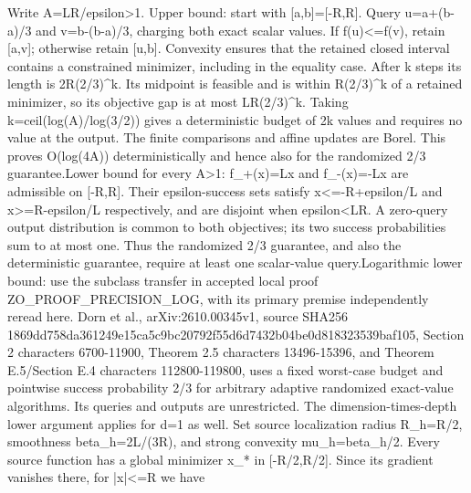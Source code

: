 \documentclass[10pt,a4paper]{article}
\begin{document}
\begingroup\raggedright\sloppy Write A=\allowbreak{}LR/\allowbreak{}epsilon>1. Upper bound:\allowbreak{} start with [a,\allowbreak{}b]=\allowbreak{}[-R,\allowbreak{}R]. Query u=\allowbreak{}a+(b-a)/\allowbreak{}3 and v=\allowbreak{}b-(b-a)/\allowbreak{}3,\allowbreak{} charging both exact scalar values. If f(u)<=\allowbreak{}f(v),\allowbreak{} retain [a,\allowbreak{}v];\allowbreak{} otherwise retain [u,\allowbreak{}b]. Convexity ensures that the retained closed interval contains a constrained minimizer,\allowbreak{} including in the equality case. After k steps its length is 2R(2/\allowbreak{}3)\textasciicircum{}k. Its midpoint is feasible and is within R(2/\allowbreak{}3)\textasciicircum{}k of a retained minimizer,\allowbreak{} so its objective gap is at most LR(2/\allowbreak{}3)\textasciicircum{}k. Taking k=\allowbreak{}ceil(log(A)/\allowbreak{}log(3/\allowbreak{}2)) gives a deterministic budget of 2k values and requires no value at the output. The finite comparisons and affine updates are Borel. This proves O(log(4A)) deterministically and hence also for the randomized 2/\allowbreak{}3 guarantee.\newline{}\newline{}Lower bound for every A>1:\allowbreak{} f\_\allowbreak{}+(x)=\allowbreak{}Lx and f\_\allowbreak{}-(x)=\allowbreak{}-Lx are admissible on [-R,\allowbreak{}R]. Their epsilon-success sets satisfy x<=\allowbreak{}-R+epsilon/\allowbreak{}L and x>=\allowbreak{}R-epsilon/\allowbreak{}L respectively,\allowbreak{} and are disjoint when epsilon<LR. A zero-query output distribution is common to both objectives;\allowbreak{} its two success probabilities sum to at most one. Thus the randomized 2/\allowbreak{}3 guarantee,\allowbreak{} and also the deterministic guarantee,\allowbreak{} require at least one scalar-value query.\newline{}\newline{}Logarithmic lower bound:\allowbreak{} use the subclass transfer in accepted local proof ZO\_\allowbreak{}PROOF\_\allowbreak{}PRECISION\_\allowbreak{}LOG,\allowbreak{} with its primary premise independently reread here. Dorn et al.,\allowbreak{} arXiv:\allowbreak{}2610.00345v1,\allowbreak{} source SHA256 1869dd758da361249e15ca5c9bc20792f55d6d7432b04be0d818323539baf105,\allowbreak{} Section 2 characters 6700-11900,\allowbreak{} Theorem 2.5 characters 13496-15396,\allowbreak{} and Theorem E.5/\allowbreak{}Section E.4 characters 112800-119800,\allowbreak{} uses a fixed worst-case budget and pointwise success probability 2/\allowbreak{}3 for arbitrary adaptive randomized exact-value algorithms. Its queries and outputs are unrestricted. The dimension-times-depth lower argument applies for d=\allowbreak{}1 as well. Set source localization radius R\_\allowbreak{}h=\allowbreak{}R/\allowbreak{}2,\allowbreak{} smoothness beta\_\allowbreak{}h=\allowbreak{}2L/\allowbreak{}(3R),\allowbreak{} and strong convexity mu\_\allowbreak{}h=\allowbreak{}beta\_\allowbreak{}h/\allowbreak{}2. Every source function has a global minimizer x\_\allowbreak{}* in [-R/\allowbreak{}2,\allowbreak{}R/\allowbreak{}2]. Since its gradient vanishes there,\allowbreak{} for |x|<=\allowbreak{}R we have 
\end{document}

